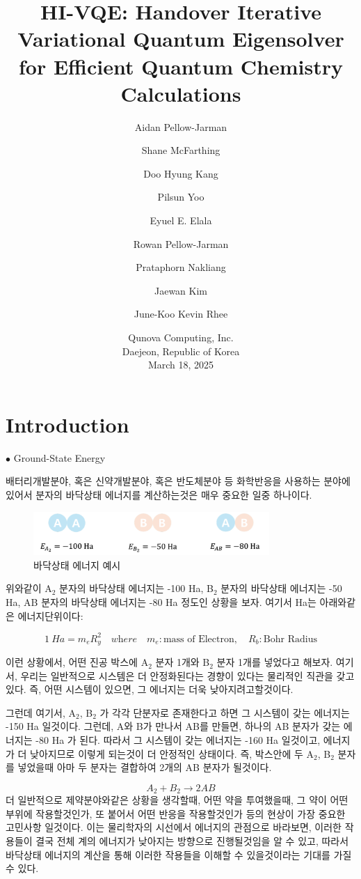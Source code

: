 \documentclass[11pt]{article}
\title{
  HI-VQE: Handover Iterative Variational Quantum Eigensolver\\
  for Efficient Quantum Chemistry Calculations
}
\author{
  Aidan Pellow-Jarman \and
  Shane McFarthing \and
  Doo Hyung Kang \and
  Pilsun Yoo \and
  Eyuel E. Elala \and
  Rowan Pellow-Jarman \and
  Prataphorn Nakliang \and
  Jaewan Kim \and
  June-Koo Kevin Rhee
}
\date{
  Qunova Computing, Inc.\\
  Daejeon, Republic of Korea\\[1ex]
  March 18, 2025
}
\begin{document}
\maketitle

\section{Introduction}
{\Large $\bullet$ Ground-State Energy}

배터리개발분야, 혹은 신약개발분야, 혹은 반도체분야 등 화학반응을 사용하는 분야에 있어서 분자의 바닥상태 에너지를 계산하는것은 매우 중요한 일중 하나이다. 
\begin{figure}[htbp]
  \centering
  \includegraphics[width=0.8\textwidth]{fig/Eg예시.png}
  \caption{바닥상태 에너지 예시}
  \label{fig:example}
\end{figure}

위와같이 A\(_2\) 분자의 바닥상태 에너지는 -100 Ha, B\(_2\) 분자의 바닥상태 에너지는 -50 Ha, AB 분자의 바닥상태 에너지는 -80 Ha 정도인 상황을 보자. 여기서 Ha는 아래와같은 에너지단위이다:

\[
1~Ha = m_e R_y^2 \quad \textit{where} \quad m_e: \text{mass of Electron}, \quad R_b: \text{Bohr Radius}
\]

이런 상황에서, 어떤 진공 박스에 A\(_2\) 분자 1개와 B\(_2\) 분자 1개를 넣었다고 해보자. 
여기서, 우리는 일반적으로 시스템은 더 안정화된다는 경향이 있다는 물리적인 직관을 갖고 있다. 
즉, 어떤 시스템이 있으면, 그 에너지는 더욱 낮아지려고할것이다.

그런데 여기서, A\(_2\), B\(_2\) 가 각각 단분자로 존재한다고 하면 그 시스템이 갖는 에너지는 -150 Ha 일것이다. 
그런데, A와 B가 만나서 AB를 만들면, 하나의 AB 분자가 갖는 에너지는 -80 Ha 가 된다. 
따라서  그 시스템이 갖는 에너지는 -160 Ha 일것이고, 에너지가 더 낮아지므로 이렇게 되는것이 더 안정적인 상태이다.
즉, 박스안에 두 A\(_2\), B\(_2\) 분자를 넣었을때 아마 두 분자는 결합하여 2개의 AB 분자가 될것이다. 

\[
A_2 + B_2 \rightarrow 2AB
\]
더 일반적으로 제약분야와같은 상황을 생각할때, 어떤 약을 투여했을때, 그 약이 어떤 부위에 작용할것인가, 또 붙어서 어떤 반응을 작용할것인가 등의 현상이 가장 중요한 고민사항 일것이다.
이는 물리학자의 시선에서 에너지의 관점으로 바라보면, 이러한 작용들이 결국 전체 계의 에너지가 낮아지는 방향으로 진행될것임을 알 수 있고,
따라서 바닥상태 에너지의 계산을 통해 이러한 작용들을 이해할 수 있을것이라는 기대를 가질 수 있다.
\end{document}

